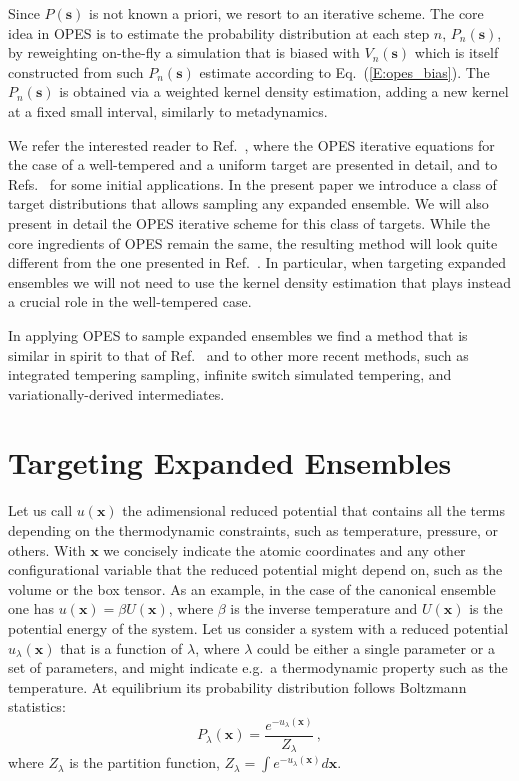 \documentclass[aps,prx,reprint,superscriptaddress]{revtex4-1} %
\begin{document}
Since $P(\mathbf{s})$ is not known a priori, we resort to an iterative scheme.
The core idea in OPES is to estimate the probability distribution at each step $n$, $P_n(\mathbf{s})$, by reweighting on-the-fly a simulation that is biased with $V_n(\mathbf{s})$ which is itself constructed from such $P_n(\mathbf{s})$ estimate according to Eq.~(\ref{E:opes_bias}).
The $P_n(\mathbf{s})$ is obtained via a weighted kernel density estimation, adding a new kernel at a fixed small interval, similarly to metadynamics.

We refer the interested reader to Ref.~, where the OPES iterative equations for the case of a well-tempered and a uniform target are presented in detail, and to Refs.~ for some initial applications.
In the present paper we introduce a class of target distributions that allows sampling any expanded ensemble.
We will also present in detail the OPES iterative scheme for this class of targets.
While the core ingredients of OPES remain the same, the resulting method will look quite different from the one presented in Ref.~.
In particular, when targeting expanded ensembles we will not need to use the kernel density estimation that plays instead a crucial role in the well-tempered case.

In applying OPES to sample expanded ensembles we find a method that is similar in spirit to that of Ref.~ and to other more recent methods, such as integrated tempering sampling\cite{Gao2008}, infinite switch simulated tempering\cite{Martinsson2019}, and variationally-derived intermediates\cite{Reinhardt2020}.


\section{Targeting Expanded Ensembles\label{S:targeting}}
Let us call $u(\mathbf{x})$ the adimensional reduced potential that contains all the terms depending on the thermodynamic constraints, such as temperature, pressure, or others.
With $\mathbf{x}$ we concisely indicate the atomic coordinates and any other configurational variable that the reduced potential might depend on, such as the volume or the box tensor.
As an example, in the case of the canonical ensemble one has $u(\mathbf{x})=\beta U(\mathbf{x})$, where $\beta$ is the inverse temperature and $U(\mathbf{x})$ is the potential energy of the system.
Let us consider a system with a reduced potential $u_\lambda(\mathbf{x})$ that is a function of $\lambda$, where $\lambda$ could be either a single parameter or a set of parameters, and might indicate e.g.~a thermodynamic property such as the temperature.
At equilibrium its probability distribution follows Boltzmann statistics:
\begin{equation}\label{E:probability}
    P_\lambda(\mathbf{x})=\frac{e^{-u_\lambda(\mathbf{x})}}{Z_\lambda}\, ,
\end{equation}
where $Z_\lambda$ is the partition function, $Z_\lambda=\int e^{-u_\lambda(\mathbf{x})}d \mathbf{x}$.
\end{document}
